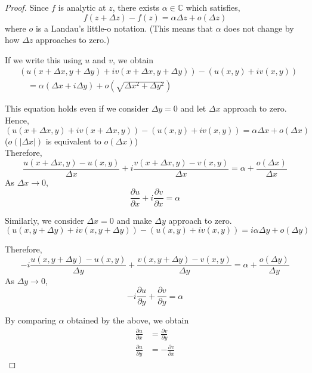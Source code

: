 \documentclass[letterpaper, 12pt]{article}
\theoremstyle{custom}
\begin{document}
\begin{proof}
  Since $f$ is analytic at $z$, there exists $\alpha \in \mathbb{C}$ which satisfies,
  \begin{equation*}
    f(z+\Delta z) - f(z) = \alpha \Delta z + o(\Delta z)
  \end{equation*}
  where $o$ is a Landau's little-o notation.
  (This means that $\alpha$ does not change by how $\Delta z$ approaches to zero.)

  If we write this using $u$ and $v$, we obtain
  \begin{align*}
    &\left( u(x+\Delta x, y+\Delta y) + iv(x+\Delta x, y+\Delta y) \right) - \left( u(x, y) + iv(x, y) \right) \\
    & \quad = \alpha \left( \Delta x + i\Delta y \right) + o\left( \sqrt{\Delta x^2 + \Delta y^2}\right)
  \end{align*}
  
  This equation holds even if we consider $\Delta y=0$ and let $\Delta x$ approach to zero.
  Hence,
  \begin{equation*}
    \left( u(x+\Delta x, y) + iv(x+\Delta x, y) \right) - \left( u(x, y) + iv(x, y) \right)
    = \alpha \Delta x + o\left( \Delta x \right)
  \end{equation*}
  ($o(\left| \Delta x \right|)$ is equivalent to $o(\Delta x)$)\\
  
  Therefore,
  \begin{equation*}
    \frac{u(x+\Delta x, y) - u(x, y)}{\Delta x} + i \frac{v(x+\Delta x, y) - v(x, y)}{\Delta x} = \alpha + \frac{o\left( \Delta x \right)}{\Delta x}
  \end{equation*}
  As $\Delta x \rightarrow 0$,
  \begin{equation*}
    \frac{\partial u}{\partial x} + i \frac{\partial v}{\partial x} = \alpha
  \end{equation*}

  Similarly, we consider $\Delta x=0$ and make $\Delta y$ approach to zero.
  \begin{equation*}
    \left( u(x, y+\Delta y) + iv(x, y+\Delta y) \right) - \left( u(x, y) + iv(x, y) \right)
    = i \alpha \Delta y + o\left( \Delta y \right)
  \end{equation*}
 
  Therefore,
  \begin{equation*}
    -i \frac{u(x, y+\Delta y) - u(x, y)}{\Delta y} + \frac{v(x, y+\Delta y) - v(x, y)}{\Delta y} = \alpha + \frac{o\left( \Delta y \right)}{\Delta y}
  \end{equation*}
  As $\Delta y \rightarrow 0$,
  \begin{equation*}
    -i\frac{\partial u}{\partial y} +  \frac{\partial v}{\partial y} = \alpha
  \end{equation*}
  
  By comparing $\alpha$ obtained by the above, we obtain
  \begin{align*}
    \frac{\partial u}{\partial x} &= \frac{\partial v}{\partial y} \\
    \frac{\partial u}{\partial y} &= -\frac{\partial v}{\partial x}
  \end{align*}
\end{proof}
\end{document}
